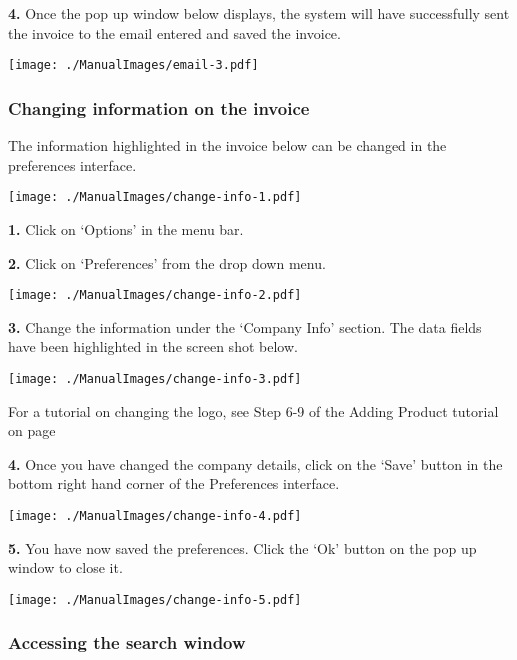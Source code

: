 \textbf{4.} Once the pop up window below displays, the system will have successfully sent the invoice to the email entered and saved the invoice.

\texttt{[image: ./ManualImages/email-3.pdf]}

\pagebreak
\subsubsection{Changing information on the invoice}
\label{fig:Changing information on the invoice}

The information highlighted in the invoice below can be changed in the preferences interface.

\texttt{[image: ./ManualImages/change-info-1.pdf]}

\pagebreak

\textbf{1.} Click on `Options' in the menu bar.

\textbf{2.} Click on `Preferences' from the drop down menu.

\texttt{[image: ./ManualImages/change-info-2.pdf]}

\pagebreak

\textbf{3.} Change the information under the `Company Info' section. The data fields have been highlighted in the screen shot below.

\texttt{[image: ./ManualImages/change-info-3.pdf]}

For a tutorial on changing the logo, see Step 6-9 of the Adding Product tutorial on page \pageref{fig:Adding a Product to the system}

\pagebreak

\textbf{4.} Once you have changed the company details, click on the `Save' button in the bottom right hand corner of the Preferences interface.

\texttt{[image: ./ManualImages/change-info-4.pdf]}

\pagebreak

\textbf{5.} You have now saved the preferences. Click the `Ok' button on the pop up window to close it.

\texttt{[image: ./ManualImages/change-info-5.pdf]}

\pagebreak
\subsubsection{Accessing the search window}
\label{fig:Accessing the search window}

